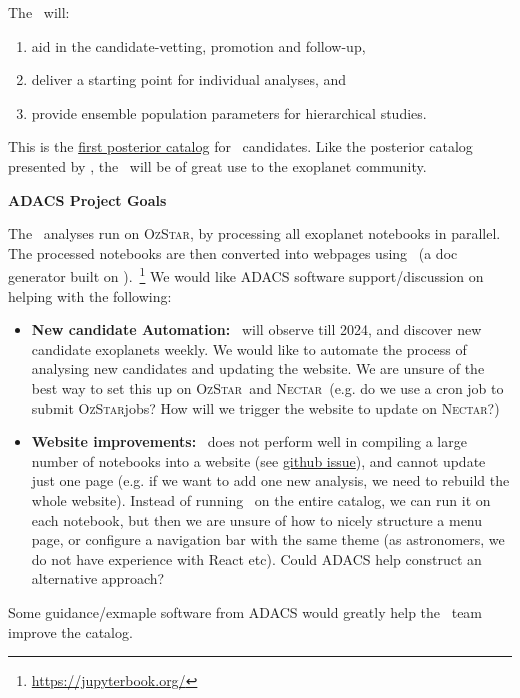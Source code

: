 \documentclass[floatfix,onecolumn]{aastex631}
\newcommand{\ozstar}{\textsc{OzStar}}
\newcommand{\nectar}{\textsc{Nectar}}
\begin{document}
The \tessAtlas\ will:
\begin{enumerate}
    \item aid in the candidate-vetting, promotion and follow-up, 
    \item deliver a starting point for individual analyses, and
    \item provide ensemble population parameters for hierarchical studies.
\end{enumerate}

This is the \underline{first posterior catalog} for \tess\ candidates. Like the  posterior catalog presented by \citet{Rowe:2014:ApJ}, the \tessAtlas\ will be of great use to the exoplanet community. 

\vspace{1em}


\large{\textbf{ADACS Project Goals}}\hfill\vspace{0.3em}

The \tessAtlas\ analyses run on \ozstar, by processing all exoplanet notebooks in parallel. 
The processed notebooks are then converted into webpages using \jupyterbook\ (a doc generator built on \sphinx).~\footnote{\url{https://jupyterbook.org/}}
We would like ADACS software support/discussion on helping with the following:

\begin{itemize}
    \item \textbf{New candidate Automation:} \tess\ will observe till 2024, and discover new candidate exoplanets weekly. We would like to automate the process of analysing new candidates and updating the website. We are unsure of the best way to set this up on 
    \ozstar\ and \nectar\ (e.g. do we use a cron job to submit \ozstar jobs? How will we trigger the website to update on \nectar?)
    \item \textbf{Website improvements:} \jupyterbook\ does not perform well in compiling a large number of notebooks into a website (see \href{https://github.com/executablebooks/jupyter-book/issues/1571}{github issue}), and cannot update just one page (e.g. if we want to add one new analysis, we need to rebuild the whole website). Instead of running \jupyterbook\ on the entire catalog, we can run it on each notebook, but then we are unsure of how to nicely structure a menu page, or configure a navigation bar with the same theme (as astronomers, we do not have experience with React etc). Could ADACS help construct an alternative approach?
\end{itemize}

Some guidance/exmaple software from ADACS would greatly help the \tessAtlas\ team improve the catalog.

\newpage


\end{document}
